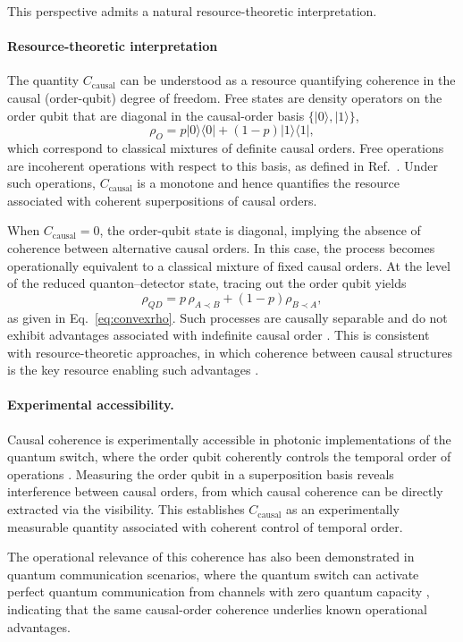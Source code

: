 \documentclass[aps,pra,reprint,superscriptaddress]{revtex4-2}
\begin{document}
This perspective admits a natural resource-theoretic interpretation.

\paragraph*{Resource-theoretic interpretation}
The quantity $C_{\mathrm{causal}}$ can be understood as a resource
quantifying coherence in the causal (order-qubit) degree of freedom. Free states are density operators on the order qubit that are diagonal in the causal-order basis $\{|0\rangle,|1\rangle\}$,
\[
\rho_O = p|0\rangle\langle0| + (1-p)|1\rangle\langle1|,
\]
which correspond to classical mixtures of definite causal orders. Free operations are incoherent operations with respect to this basis, as defined in Ref.~\cite{Baumgratz2014}. Under such operations, $C_{\mathrm{causal}}$ is a monotone and hence
quantifies the resource associated with coherent superpositions of
causal orders.

When $C_{\mathrm{causal}}=0$, the order-qubit state is diagonal, implying the absence of coherence between alternative causal orders. In this case, the process becomes operationally equivalent to a classical mixture of fixed causal orders. At the level of the reduced quanton--detector state, tracing out the order qubit yields
\[
\rho_{QD}=p\,\rho_{A\prec B}+(1-p)\rho_{B\prec A},
\]
as given in Eq.~\eqref{eq:convexrho}. Such processes are causally separable and do not exhibit advantages associated with indefinite causal order \cite{Chiribella2012,Ebler2018,Chiribella2021}. This is consistent with resource-theoretic approaches, in which coherence between causal structures is the key resource enabling such advantages \cite{Oreshkov2012,Chiribella2013}.

\paragraph*{Experimental accessibility.}
Causal coherence is experimentally accessible in photonic implementations of the quantum switch, where the order qubit coherently controls the temporal order of operations \cite{Procopio2015,Rubino2017,Goswami2018}. Measuring the order qubit in a superposition basis reveals interference between causal orders, from which causal coherence can be directly extracted via the visibility. This establishes $C_{\mathrm{causal}}$ as an experimentally measurable quantity associated with coherent control of temporal order.

The operational relevance of this coherence has also been demonstrated in quantum communication scenarios, where the quantum switch can activate perfect quantum communication from channels with zero quantum capacity \cite{Chiribella2021}, indicating that the same causal-order coherence underlies known operational advantages.
\end{document}
